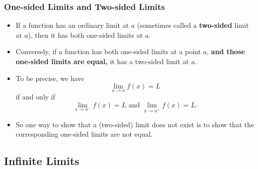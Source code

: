 \documentclass[serif,ignorenonframetext]{beamer}
\begin{document}
\begin{frame}
  \frametitle{One-sided Limits and Two-sided Limits}
  \begin{itemize}
  \item If a function has an ordinary limit at $a$ (sometimes called
    a \textbf{two-sided} limit at $a$), then it has both one-sided limits
    at $a$.
  \pause
  \item Conversely, if a function has both one-sided limits at
    a point $a$, \textbf{and
    those one-sided limits are equal,} it has a two-sided limit
    at $a$.
  \pause
  \item To be precise, we have 
    \begin{displaymath}
      \lim_{x\to a} f(x) = L
    \end{displaymath}
    if and only if
    \begin{displaymath}
      \lim_{x\to a^-} f(x) = L \mbox{ and } \lim_{x\to a^+} f(x) = L.
    \end{displaymath}
    \pause
  \item So one way to show that a (two-sided) limit does not exist is
    to show that the corresponding one-sided limits are not equal.
  \end{itemize}
\end{frame}


\subsection{Infinite Limits}
\end{document}
